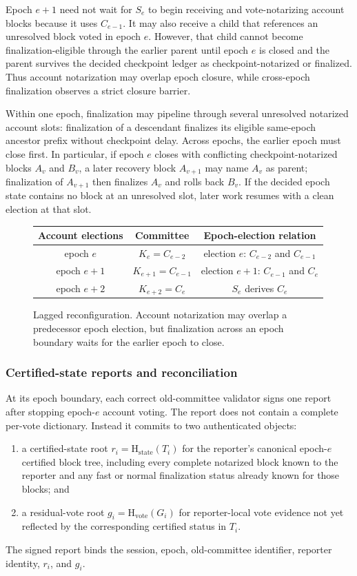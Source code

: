 \documentclass[10pt,twocolumn]{article}
\newcommand{\StateHash}{\mathrm{H}_{\mathrm{state}}}
\newcommand{\VoteHash}{\mathrm{H}_{\mathrm{vote}}}
\begin{document}
Epoch $e+1$ need not wait for $S_e$ to begin receiving and vote-notarizing account blocks because it uses $C_{e-1}$. It may also receive a child that references an unresolved block voted in epoch $e$. However, that child cannot become finalization-eligible through the earlier parent until epoch $e$ is closed and the parent survives the decided checkpoint ledger as checkpoint-notarized or finalized. Thus account notarization may overlap epoch closure, while cross-epoch finalization observes a strict closure barrier.

Within one epoch, finalization may pipeline through several unresolved notarized account slots: finalization of a descendant finalizes its eligible same-epoch ancestor prefix without checkpoint delay. Across epochs, the earlier epoch must close first. In particular, if epoch $e$ closes with conflicting checkpoint-notarized blocks $A_v$ and $B_v$, a later recovery block $A_{v+1}$ may name $A_v$ as parent; finalization of $A_{v+1}$ then finalizes $A_v$ and rolls back $B_v$. If the decided epoch state contains no block at an unresolved slot, later work resumes with a clean election at that slot.

\begin{figure}[t]
\centering
\small
\begin{tabular}{c|c|c}
Account elections & Committee & Epoch-election relation\\
\hline
epoch $e$ & $K_e=C_{e-2}$ & election $e$: $C_{e-2}$ and $C_{e-1}$\\
epoch $e+1$ & $K_{e+1}=C_{e-1}$ & election $e+1$: $C_{e-1}$ and $C_e$\\
epoch $e+2$ & $K_{e+2}=C_e$ & $S_e$ derives $C_e$\\
\end{tabular}
\caption{Lagged reconfiguration. Account notarization may overlap a predecessor epoch election, but finalization across an epoch boundary waits for the earlier epoch to close.}
\end{figure}

\subsubsection{Certified-state reports and reconciliation}
At its epoch boundary, each correct old-committee validator signs one report after stopping epoch-$e$ account voting. The report does not contain a complete per-vote dictionary. Instead it commits to two authenticated objects:
\begin{enumerate}
\item a certified-state root $r_i=\StateHash(T_i)$ for the reporter's canonical epoch-$e$ certified block tree, including every complete notarized block known to the reporter and any fast or normal finalization status already known for those blocks; and
\item a residual-vote root $g_i=\VoteHash(G_i)$ for reporter-local vote evidence not yet reflected by the corresponding certified status in $T_i$.
\end{enumerate}
The signed report binds the session, epoch, old-committee identifier, reporter identity, $r_i$, and $g_i$.
\end{document}
